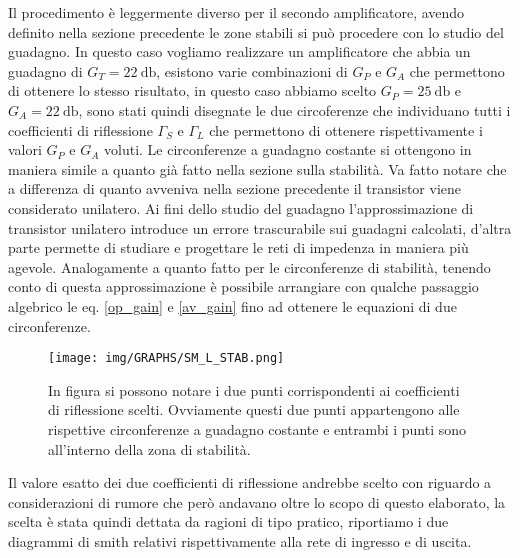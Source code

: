 \documentclass[12pt,oneside]{book}
\begin{document}
Il procedimento è leggermente diverso per il secondo amplificatore, avendo definito nella sezione precedente le zone stabili si può procedere con lo studio del guadagno.
In questo caso vogliamo realizzare un amplificatore che abbia un guadagno di $G_T=\SI{22}{\decibel}$, esistono varie combinazioni di $G_P$ e $G_A$ che permettono di ottenere lo stesso risultato, in questo caso abbiamo scelto $G_P=\SI{25}{\decibel}$ e $G_A=\SI{22}{\decibel}$, sono stati quindi disegnate le due circoferenze che individuano tutti i coefficienti di riflessione $\Gamma_{S}$ e $\Gamma_{L}$ che permettono di ottenere rispettivamente i valori $G_P$ e $G_A$ voluti. Le circonferenze a guadagno costante si ottengono in maniera simile a quanto già fatto nella sezione sulla stabilità. Va fatto notare che a differenza di quanto avveniva nella sezione precedente il transistor viene considerato unilatero. Ai fini dello studio del guadagno l'approssimazione di transistor unilatero introduce un errore trascurabile sui guadagni calcolati, d'altra parte permette di studiare e progettare le reti di impedenza in maniera più agevole. Analogamente a quanto fatto per le circonferenze di stabilità, tenendo conto di questa approssimazione è possibile arrangiare con qualche passaggio algebrico le eq. \ref{op_gain} e \ref{av_gain} fino ad ottenere le equazioni di due circonferenze.

\begin{figure}[!htbp]
    \centering
        \texttt{[image: img/GRAPHS/SM\_L\_STAB.png]}
        \caption{In figura si possono notare i due punti corrispondenti ai coefficienti di riflessione scelti. Ovviamente questi due punti appartengono alle rispettive circonferenze a guadagno costante e entrambi i punti sono all'interno della zona di stabilità.}
\end{figure}

Il valore esatto dei due coefficienti di riflessione andrebbe scelto con riguardo a considerazioni di rumore che però andavano oltre lo scopo di questo elaborato, la scelta è stata quindi dettata da ragioni di tipo pratico, riportiamo i due diagrammi di smith relativi rispettivamente alla rete di ingresso e di uscita.
\end{document}
